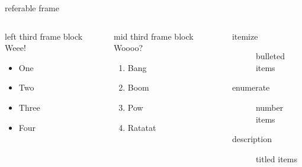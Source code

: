 \documentclass[10pt, compress]{beamer}
\begin{document}
\begin{frame}[label={sec:orgb6b24f8}]{referable frame}
  \begin{columns}
    \begin{column}{0.3\columnwidth}
      \begin{block}{left third frame block}
        Weee!
        \begin{itemize} %
        \item One
        \item Two
        \item Three
        \item Four       
        \end{itemize}
      \end{block}
    \end{column}

    \begin{column}{0.3\columnwidth}
      \begin{block}{mid third frame block}
        Woooo?
        \begin{enumerate} %
        \item Bang
        \item Boom
        \item Pow
        \item Ratatat
        \end{enumerate}
      \end{block}
    \end{column}

    \begin{column}{.4\columnwidth}
      \begin{example}[of lists] %
        \begin{description} %
        \item[{itemize}] bulleted items
        \item[{enumerate}] number items
        \item[{description}] titled items
        \end{description}
      \end{example}
    \end{column}
  \end{columns}
\end{frame}
\end{document}
